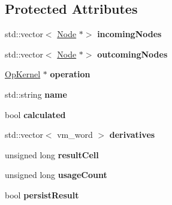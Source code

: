 \subsection*{Protected Attributes}
\begin{DoxyCompactItemize}
\item 
\mbox{\label{classathena_1_1core_1_1_node_aa46df2cfca5ac1bb88d683e52614397e}} 
std\+::vector$<$ \mbox{\hyperlink{classathena_1_1core_1_1_node}{Node}} $\ast$$>$ {\bfseries incoming\+Nodes}
\item 
\mbox{\label{classathena_1_1core_1_1_node_a156010639b24e35c17cbe15de5078bbb}} 
std\+::vector$<$ \mbox{\hyperlink{classathena_1_1core_1_1_node}{Node}} $\ast$$>$ {\bfseries outcoming\+Nodes}
\item 
\mbox{\label{classathena_1_1core_1_1_node_a27276034dd9d663c195e6233d32013be}} 
\mbox{\hyperlink{classathena_1_1core_1_1_op_kernel}{Op\+Kernel}} $\ast$ {\bfseries operation}
\item 
\mbox{\label{classathena_1_1core_1_1_node_a4f2c3e1d4c44cf45bfa78909d4df3777}} 
std\+::string {\bfseries name}
\item 
\mbox{\label{classathena_1_1core_1_1_node_a9b66b2c502174ec4253540e785ed65d1}} 
bool {\bfseries calculated}
\item 
\mbox{\label{classathena_1_1core_1_1_node_a753a10d861a9e65c0ceac674a64f93b2}} 
std\+::vector$<$ vm\+\_\+word $>$ {\bfseries derivatives}
\item 
\mbox{\label{classathena_1_1core_1_1_node_a3b79e7b88f22fac99cca9323bd2fb644}} 
unsigned long {\bfseries result\+Cell}
\item 
\mbox{\label{classathena_1_1core_1_1_node_ad8f1fef6f146b1fcc73b9333a5dc3fa0}} 
unsigned long {\bfseries usage\+Count}
\item 
\mbox{\label{classathena_1_1core_1_1_node_af1bbfd345484381b1ec5ef9aa880db22}} 
bool {\bfseries persist\+Result}
\end{DoxyCompactItemize}


